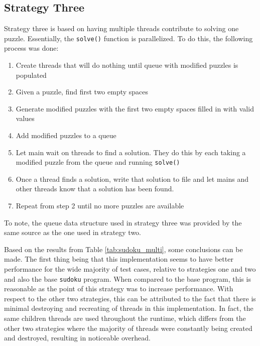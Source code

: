 \documentclass[12pt,reqno]{article}
\begin{document}
\subsection{Strategy Three}
Strategy three is based on having multiple threads contribute to solving one puzzle. Essentially, the \texttt{solve()} function is parallelized. To do this, the following process was done: 

\begin{enumerate}
    \item Create threads that will do nothing until queue with modified puzzles is populated
    \item Given a puzzle, find first two empty spaces
    \item Generate modified puzzles with the first two empty spaces filled in with valid values
    \item Add modified puzzles to a queue
    \item Let main wait on threads to find a solution. They do this by each taking a modified puzzle from the queue and running \texttt{solve()}
    \item Once a thread finds a solution, write that solution to file and let mains and other threads know that a solution has been found.
    \item Repeat from step 2 until no more puzzles are available
\end{enumerate}

To note, the queue data structure used in strategy three was provided by the same source as the one used in strategy two. 

Based on the results from Table \ref{tab:sudoku_multi}, some conclusions can be made. The first thing being that this implementation seems to have better performance for the wide majority of test cases, relative to strategies one and two and also the base \texttt{sudoku} program. When compared to the base program, this is reasonable as the point of this strategy was to increase performance. With respect to the other two strategies, this can be attributed to the fact that there is minimal destroying and recreating of threads in this implementation. In fact, the same children threads are used throughout the runtime, which differs from the other two strategies where the majority of threads were constantly being created and destroyed, resulting in noticeable overhead.
\end{document}
